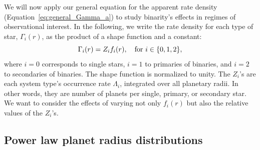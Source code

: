 \documentclass[12pt,modern]{aastex61}
\begin{document}
We will now apply our general equation for the apparent rate density
(Equation~\ref{eq:general_Gamma_a}) to study binarity's effects in
regimes of observational interest.  In the following, we write the
rate density for each type of star, $\Gamma_i(r)$, as the product of a
shape function and a constant:
\begin{equation}
    \Gamma_i(r) = Z_i f_i(r), \quad {\rm for\ }i\in\{0,1,2\},
\end{equation}
where $i=0$ corresponds to single stars, $i=1$ to primaries of
binaries, and $i=2$ to secondaries of binaries.  The shape function is
normalized to unity.  The $Z_i$'s are each system type's occurrence
rate $\Lambda_i$, integrated over all planetary radii. In other words,
they are number of planets per single, primary, or secondary star.  We
want to consider the effects of varying not only $f_i(r)$ but also the
relative values of the $Z_i$'s.

\subsection{Power law planet radius distributions}
\label{sec:model_2}
\end{document}
